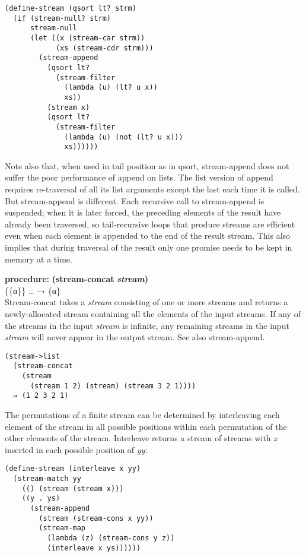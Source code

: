 \begin{verbatim}
(define-stream (qsort lt? strm)
  (if (stream-null? strm)
      stream-null
      (let ((x (stream-car strm))
            (xs (stream-cdr strm)))
        (stream-append
          (qsort lt?
            (stream-filter
              (lambda (u) (lt? u x))
              xs))
          (stream x)
          (qsort lt?
            (stream-filter
              (lambda (u) (not (lt? u x)))
              xs))))))
\end{verbatim}

Note also that, when used in tail position as in qsort, stream-append
does not suffer the poor performance of append on lists. The list
version of append requires re-traversal of all its list arguments except
the last each time it is called. But stream-append is different. Each
recursive call to stream-append is suspended; when it is later forced,
the preceding elements of the result have already been traversed, so
tail-recursive loops that produce streams are efficient even when each
element is appended to the end of the result stream. This also implies
that during traversal of the result only one promise needs to be kept in
memory at a time.

\textbf{procedure:} \textbf{(stream-concat} \textbf{\emph{stream})}\\
\{\{α\}\} \ldots{} → \{α\}\\
Stream-concat takes a \emph{stream} consisting of one or more streams
and returns a newly-allocated stream containing all the elements of the
input streams. If any of the streams in the input \emph{stream} is
infinite, any remaining streams in the input \emph{stream} will never
appear in the output stream. See also stream-append.

\begin{verbatim}
(stream->list
  (stream-concat
    (stream
      (stream 1 2) (stream) (stream 3 2 1))))
  ⇒ (1 2 3 2 1)
\end{verbatim}

The permutations of a finite stream can be determined by interleaving
each element of the stream in all possible positions within each
permutation of the other elements of the stream. Interleave returns a
stream of streams with \emph{x} inserted in each possible position of
\emph{yy}:

\begin{verbatim}
(define-stream (interleave x yy)
  (stream-match yy
    (() (stream (stream x)))
    ((y . ys)
      (stream-append
        (stream (stream-cons x yy))
        (stream-map
          (lambda (z) (stream-cons y z))
          (interleave x ys))))))
\end{verbatim}

